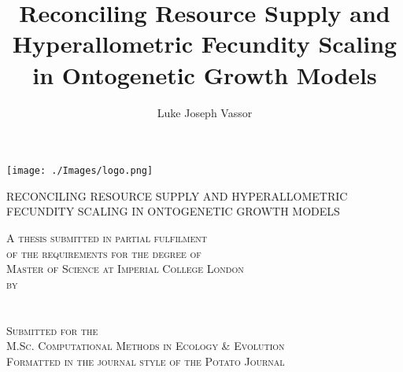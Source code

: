 \documentclass[a4paper]{article} %
\title{Reconciling Resource Supply and Hyperallometric Fecundity Scaling in Ontogenetic Growth Models}
\author{Luke Joseph Vassor}
\begin{document}
\begin{titlepage}
    
    \texttt{[image: ./Images/logo.png]}\\%
     
    
    \center %
    
    
    \makeatletter
    \linespread{1.5} %
        {\huge{RECONCILING RESOURCE SUPPLY AND HYPERALLOMETRIC FECUNDITY SCALING IN ONTOGENETIC GROWTH MODELS}\par} %
    \vspace{2.5cm} %

    \textsc{A thesis submitted in partial fulfilment \\ of the requirements for the degree of \\ Master of Science at Imperial College London \\ by \\ \ }\\[2.5cm]
    \textsc{\Large \@author}\\[2.5cm]
    \textsc{Submitted for the \\ M.Sc. Computational Methods in Ecology \& Evolution \\ Formatted in the journal style of the Potato Journal \\ \ }\\[2cm]


\end{titlepage}
\end{document}
